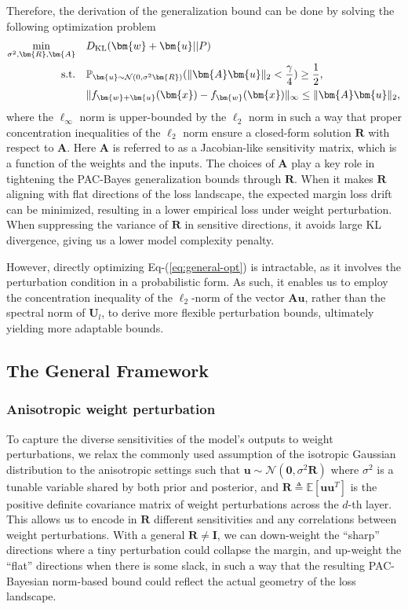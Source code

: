 \documentclass[journal]{IEEEtran} %
\def\eqref#1{Eq-(\ref{#1})}
\newcommand{\st}{{\rm s.t.}}
\def\vzero{{\bm{0}}}
\def\vu{{\bm{u}}}
\def\vw{{\bm{w}}}
\def\vx{{\bm{x}}}
\def\mA{{\bm{A}}}
\def\mI{{\bm{I}}}
\def\mR{{\bm{R}}}
\def\mU{{\bm{U}}}
\def\gN{{\mathcal{N}}}
\newcommand{\KL}{D_{\mathrm{KL}}}
\newcommand{\Norm}[1]{\|#1\|}
\begin{document}
Therefore, the derivation of the generalization bound can be done by solving the following optimization problem
\begin{subequations} \label{eq:general-opt}
\begin{align} 
    \min_{\sigma^2, \mR, \mA} \quad & \KL(\vw+\vu || P)\\
    \st \quad &\mathbb{P}_{\vu \sim \gN(0, \sigma^2 \mR)} (\Norm{\mA \vu}_2 < \frac{\gamma}{4}) \ge \frac{1}{2},\\
    & \Norm{f_{\vw+\vu}(\vx)-f_{\vw}(\vx)}_{\infty} \le \Norm{\mA \vu}_2,
\end{align}
\end{subequations}
where the $\ell_\infty$ norm is upper-bounded by the $\ell_2$ norm in such a way that proper concentration inequalities of the $\ell_2$ norm ensure a closed-form solution $\mR$ with respect to $\mA$. Here $\mA$ is referred to as a Jacobian-like sensitivity matrix, which is a function of the weights and the inputs. The choices of $\mA$ play a key role in tightening the PAC-Bayes generalization bounds through $\mR$. When it makes $\mR$ aligning with flat directions of the loss landscape, the expected margin loss drift can be minimized, resulting in a lower empirical loss under weight perturbation. When suppressing the variance of $\mR$ in sensitive directions, it avoids large KL divergence, giving us a lower model complexity penalty.

However, directly optimizing \eqref{eq:general-opt} is intractable, as it involves the perturbation condition in a probabilistic form.
% 
As such, it enables us to employ the concentration inequality of the $\ell_2$-norm of the vector $\mA \vu$, rather than the spectral norm of $\mU_l$, to derive more flexible perturbation bounds, ultimately yielding more adaptable bounds.


\subsection{The General Framework}
\subsubsection{Anisotropic weight perturbation} To capture the diverse sensitivities of the model's outputs to weight perturbations, we relax the commonly used assumption of the isotropic Gaussian distribution to the anisotropic settings such that $\vu \sim \mathcal{N}(\vzero,\sigma^2 \mR)$ where $\sigma^2$ is a tunable variable shared by both prior and posterior, and $\mR \triangleq \mathbb{E}[\vu \vu^T]$ is the positive definite covariance matrix of weight perturbations across the $d$-th layer. 
This allows us to encode in $\mR$ different sensitivities and any correlations between weight perturbations.
With a general $\mR \ne \mI$, we can down-weight the ``sharp'' directions where a tiny perturbation could collapse the margin, and up-weight the ``flat'' directions when there is some slack, in such a way that the resulting PAC-Bayesian norm-based bound could reflect the actual geometry of the loss landscape. 
\end{document}
